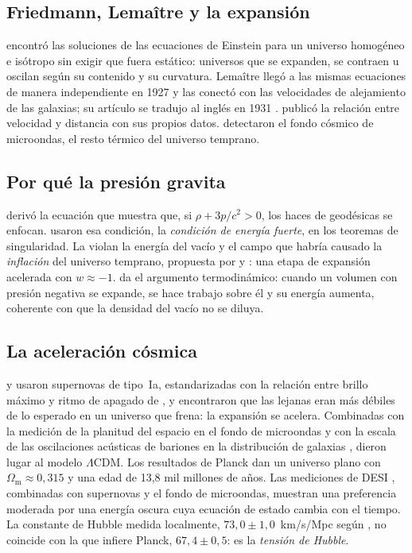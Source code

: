 \documentclass[11pt,a4paper]{article}
\begin{document}
\subsection{Friedmann, Lemaître y la expansión}

\textcite{friedmann1922} encontró las soluciones de las ecuaciones de Einstein para un universo homogéneo e isótropo sin exigir que fuera estático: universos que se expanden, se contraen u oscilan según su contenido y su curvatura. Lemaître llegó a las mismas ecuaciones de manera independiente en 1927 y las conectó con las velocidades de alejamiento de las galaxias; su artículo se tradujo al inglés en 1931 \parencite{lemaitre1931}. \textcite{hubble1929} publicó la relación entre velocidad y distancia con sus propios datos. \textcite{penzias1965} detectaron el fondo cósmico de microondas, el resto térmico del universo temprano.

\subsection{Por qué la presión gravita}

\textcite{raychaudhuri1955} derivó la ecuación que muestra que, si $\rho + 3p/c^2 > 0$, los haces de geodésicas se enfocan. \textcite{hawking1973} usaron esa condición, la \emph{condición de energía fuerte}, en los teoremas de singularidad. La violan la energía del vacío y el campo que habría causado la \emph{inflación} del universo temprano, propuesta por \textcite{starobinsky1980} y \textcite{guth1981}: una etapa de expansión acelerada con $w \approx -1$. \textcite{ryden2003} da el argumento termodinámico: cuando un volumen con presión negativa se expande, se hace trabajo sobre él y su energía aumenta, coherente con que la densidad del vacío no se diluya.

\subsection{La aceleración cósmica}

\textcite{riess1998} y \textcite{perlmutter1999} usaron supernovas de tipo~Ia, estandarizadas con la relación entre brillo máximo y ritmo de apagado de \textcite{phillips1993}, y encontraron que las lejanas eran más débiles de lo esperado en un universo que frena: la expansión se acelera. Combinadas con la medición de la planitud del espacio en el fondo de microondas \parencite{debernardis2000} y con la escala de las oscilaciones acústicas de bariones en la distribución de galaxias \parencite{eisenstein2005,cole2005}, dieron lugar al modelo $\Lambda$CDM. Los resultados de Planck \parencite{planck2020} dan un universo plano con $\Omega_{\mathrm m} \approx 0{,}315$ y una edad de 13,8 mil millones de años. Las mediciones de DESI \parencite{desi2025a,desi2025b}, combinadas con supernovas y el fondo de microondas, muestran una preferencia moderada por una energía oscura cuya ecuación de estado cambia con el tiempo. La constante de Hubble medida localmente, $73{,}0 \pm 1{,}0$~km/s/Mpc según \textcite{riess2022}, no coincide con la que infiere Planck, $67{,}4 \pm 0{,}5$: es la \emph{tensión de Hubble}.
\end{document}
